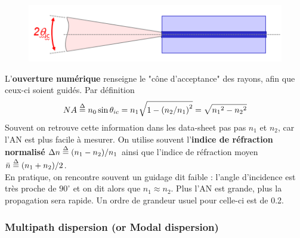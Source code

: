 \begin{figure}
	\vspace{-5mm}
	\includegraphics[scale=0.6]{ch1/image4.png}
	\end{figure}
L'\textbf{ouverture numérique} renseigne le "cône d'acceptance" des rayons, afin que ceux-ci soient
guidés. Par définition
\begin{equation}
NA \buildrel \Delta \over = {n_0}\sin {\theta _{ic}} = {n_1}\sqrt {1 - {{\left( {{{{n_2}} \mathord{\left/
 {\vphantom {{{n_2}} {{n_1}}}} \right.
 \kern-\nulldelimiterspace} {{n_1}}}} \right)}^2}}  = \sqrt {{n_1}^2 - {n_2}^2} 
\end{equation}
Souvent on retrouve cette information dans les data-sheet pas pas $n_1$ et $n_2$, car l'AN est plus
facile à mesurer. On utilise souvent l'\textbf{indice de réfraction normalisé} $\Delta n \buildrel \Delta \over = {{\left( {{n_1} - {n_2}} \right)} \mathord{\left/
 {\vphantom {{\left( {{n_1} - {n_2}} \right)} {{n_1}}}} \right.
 \kern-\nulldelimiterspace} {{n_1}}}$ ainsi que l'indice de réfraction moyen $\bar n \buildrel \Delta \over = {{\left( {{n_1} + {n_2}} \right)} \mathord{\left/
 {\vphantom {{\left( {{n_1} + {n_2}} \right)} 2}} \right.
 \kern-\nulldelimiterspace} 2}$.\\
 
En pratique, on rencontre souvent un guidage dit faible : l'angle d'incidence est très proche de 
$90^\circ $ et on dit alors que $n_1\approx n_2$. Plus l'AN est grande, plus la propagation sera rapide. Un ordre de grandeur usuel pour celle-ci est de 0.2.

\subsubsection{Multipath dispersion (or Modal dispersion)}

